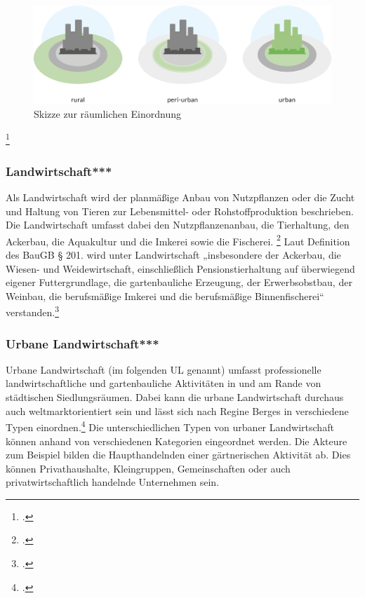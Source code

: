 \documentclass{scrartcl}
\begin{document}
\begin{figure}[htbp]
\centering
\includegraphics[width=12cm]{image_folder/SchaubildUrbaneEingrenzungen.png}
\caption{Skizze zur räumlichen Einordnung}
\label{fig:ul_typologie}
\end{figure}
\footcite[]{Eigene Zeichnung, entstanden aus dem Vorbild von Carlos Tobisch, Oasen im Beton S.26, Abb.7}

\subsubsection{Landwirtschaft***}
Als Landwirtschaft wird der planmäßige Anbau von Nutzpflanzen oder die Zucht und Haltung von Tieren zur Lebensmittel- oder Rohstoffproduktion beschrieben. Die Landwirtschaft umfasst dabei den Nutzpflanzenanbau, die Tierhaltung, den Ackerbau, die Aquakultur und die Imkerei sowie die Fischerei. \footcite[S. 5]{Lohrberg2001StadtnaheFreiraumplanung}  Laut Definition des BauGB § 201. wird unter Landwirtschaft „insbesondere der Ackerbau, die Wiesen- und Weidewirtschaft, einschließlich Pensionstierhaltung auf überwiegend eigener Futtergrundlage, die gartenbauliche Erzeugung, der Erwerbsobstbau, der Weinbau, die berufsmäßige Imkerei und die berufsmäßige Binnenfischerei“ verstanden.\footcite[§ 201]{}

\subsubsection{Urbane Landwirtschaft***}
Urbane Landwirtschaft (im folgenden UL genannt) umfasst professionelle landwirtschaftliche und gartenbauliche Aktivitäten in und am Rande von städtischen Siedlungsräumen. Dabei kann die urbane Landwirtschaft durchaus auch weltmarktorientiert sein und lässt sich nach Regine Berges in verschiedene Typen einordnen.\footcite[]{} Die unterschiedlichen Typen von urbaner Landwirtschaft können anhand von verschiedenen Kategorien eingeordnet werden. Die Akteure zum Beispiel bilden die Haupthandelnden einer gärtnerischen Aktivität ab. Dies können Privathaushalte, Kleingruppen, Gemeinschaften oder auch privatwirtschaftlich handelnde Unternehmen sein. 
\end{document}
